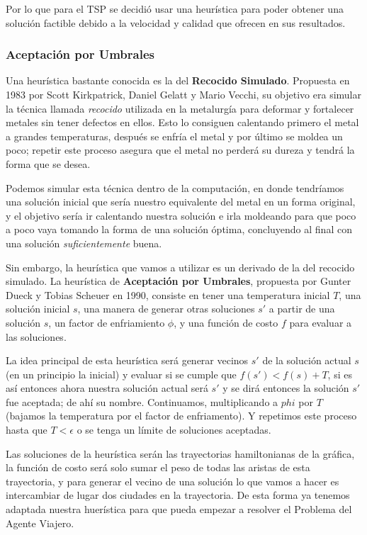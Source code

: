 \documentclass{article}
\newcommand{\tbf}[1]{\textbf{#1}}
\newcommand{\tit}[1]{\textit{#1}}
\begin{document}
  Por lo que para el TSP se decidió usar una heurística para poder 
  obtener una solución factible debido a la velocidad y calidad que
  ofrecen en sus resultados.

  \subsubsection{Aceptación por Umbrales} \label{simulatedAnnealing}
  Una heurística bastante conocida es la del \tbf{Recocido Simulado}. 
  Propuesta en 1983 por Scott Kirkpatrick, Daniel Gelatt y Mario
  Vecchi, su objetivo era simular la técnica llamada \tit{recocido}
  utilizada en la metalurgía para deformar y fortalecer metales sin 
  tener defectos en ellos. Esto lo consiguen calentando primero el 
  metal a grandes temperaturas, después se enfría el metal y por 
  último se moldea un poco; repetir este proceso asegura que el 
  metal no perderá su dureza y tendrá la forma que se desea.

  Podemos simular esta técnica dentro de la computación, en donde 
  tendríamos una solución inicial que sería nuestro equivalente 
  del metal en un forma original, y el objetivo sería ir calentando 
  nuestra solución e irla moldeando para que poco a poco vaya tomando 
  la forma de una solución óptima, concluyendo al final con una 
  solución \tit{suficientemente} buena.

  Sin embargo, la heurística que vamos a utilizar es un derivado 
  de la del recocido simulado. La heurística de \tbf{Aceptación por 
  Umbrales}, propuesta por Gunter Dueck y Tobias Scheuer en 1990,
  consiste en tener una temperatura inicial $T$, una solución 
  inicial $s$, una manera de generar otras soluciones $s'$ a partir
  de una solución $s$, un factor de enfriamiento $\phi$, y una función 
  de costo $f$ para evaluar a las soluciones.
  
  La idea principal de esta heurística será generar vecinos $s'$ de la 
  solución actual $s$ (en un principio la inicial) y evaluar si se 
  cumple que  $f(s') < f(s) + T$, si es así entonces ahora nuestra 
  solución actual será $s'$ y se dirá entonces la solución $s'$ 
  fue aceptada; de ahí su nombre. Continuamos, multiplicando 
  a $phi$ por $T$ (bajamos la temperatura por el factor de enfriamento).
  Y repetimos este proceso hasta que $T < \epsilon$ o se tenga un 
  límite de soluciones aceptadas.

  Las soluciones de la heurística serán las trayectorias hamiltonianas
  de la gráfica, la función de costo será solo sumar el peso de todas 
  las aristas de esta trayectoria, y para generar el vecino de una 
  solución lo que vamos a hacer es intercambiar de lugar dos ciudades
  en la trayectoria. De esta forma ya tenemos adaptada nuestra 
  huerística para que pueda empezar a resolver el Problema del Agente 
  Viajero.
\end{document}
